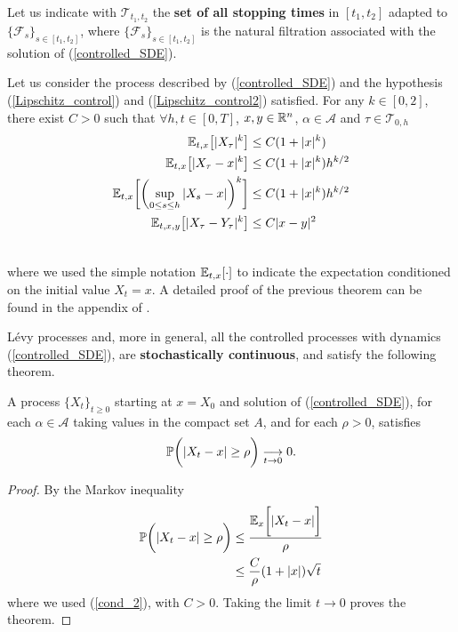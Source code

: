 \begin{Definition}
 Let us indicate with $\mathcal{T}_{t_1,t_2}$ the \textbf{set of all stopping times} in $[t_1,t_2]$ adapted to $\{\mathcal{F}_s\}_{s\in [t_1,t_2]}$,
 where
 $\{\mathcal{F}_s\}_{s\in [t_1,t_2]}$ is the natural filtration associated with the solution of (\ref{controlled_SDE}).
\end{Definition}
\begin{Theorem}
 Let us consider the process described by (\ref{controlled_SDE}) and the hypothesis (\ref{Lipschitz_control}) and (\ref{Lipschitz_control2}) satisfied. 
 For any $k \in [0,2]$, there exist $C>0$ such that $\forall h,t \in [0,T]$, $x,y \in \mathbb{R}^n$, 
 $\alpha \in \mathcal{A}$ and $\tau \in \mathcal{T}_{0,h}$
 \begin{align}
  \mathbb{E}_{t,x}\bigl[ |X_{\tau}|^k \bigr] &\leq C (1+|x|^k) \\ \label{cond_2}
  \mathbb{E}_{t,x}\bigl[ |X_{\tau} - x|^k \bigr] &\leq C (1+|x|^k)h^{k/2} \\ \label{cond_3}
  \mathbb{E}_{t,x}\biggl[ \biggl( \sup_{0\leq s\leq h} |X_{s} - x| \biggr)^k \biggr] &\leq C (1+|x|^k)h^{k/2} \\ 
  \mathbb{E}_{t,x,y}\bigl[ |X_{\tau} - Y_{\tau}|^k \bigr] &\leq C |x-y|^2 \\ \nonumber
 \end{align}
\end{Theorem}
\noindent where we used the simple notation $\mathbb{E}_{t,x}[\cdot]$ to indicate the expectation conditioned on the initial value $X_t=x$.   
A detailed proof of the previous theorem can be found in the appendix of \cite{Ph98}.

Lévy processes and, more in general, all the controlled processes with dynamics (\ref{controlled_SDE}), 
are \textbf{stochastically continuous}, and satisfy the following theorem.
\begin{Theorem}\label{stochastic_theorem}
 A process $\{X_t\}_{t\geq0}$ starting at $x=X_0$ and solution of (\ref{controlled_SDE}), for each $ \alpha \in \mathcal{A}$ taking values in the compact set $A$, 
 and for each $\rho>0$, satisfies
 \begin{equation}
   \mathbb{P} \biggl( | X_t - x | \geq \rho \biggr) \underset{t\to0}{\longrightarrow} 0.
 \end{equation}
\end{Theorem}
\begin{proof}
By the Markov inequality
 \begin{align*}
  \mathbb{P} \biggl( | X_t - x | \geq \rho \biggr) & \leq \frac{\mathbb{E}_{x}\biggl[ |X_t - x| \biggr]}{\rho} \\
   & \leq \frac{C}{\rho} (1+|x|)\sqrt{t}
 \end{align*}
 where we used (\ref{cond_2}), with $C>0$. Taking the limit $t\to 0$ proves the theorem.
\end{proof}

